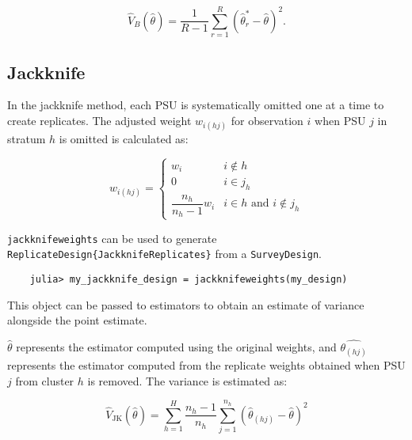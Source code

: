 \documentclass{juliacon}
\begin{document}
\begin{equation}
        \hat{V}_B(\hat{\theta}) = \dfrac{1}{R-1}\sum_{r=1}^{R} (\hat{\theta}^*_r - \hat{\theta})^2.
\end{equation}


\subsection{Jackknife}
In the jackknife method, each PSU is systematically omitted one at a time to create replicates. The adjusted weight \( w_{i(hj)} \) for observation \( i \) when PSU \( j \) in stratum \( h \) is omitted is calculated as:

\begin{equation}
    w_{i(hj)} = \begin{cases}
        w_i & i \notin h\\
    0 & i \in j_{h} \\
    \dfrac{n_h}{n_h - 1} w_i &  i \in h \text{ and } i \notin j_{h}
    \end{cases} %
    \end{equation} \cite{Lohr}

\verb|jackknifeweights| can be used to generate \verb|ReplicateDesign{JackknifeReplicates}| from a \verb|SurveyDesign|. 

\begin{lstlisting}
    julia> my_jackknife_design = jackknifeweights(my_design)
    \end{lstlisting}


This object can be passed to estimators to obtain an estimate of variance alongside the point estimate. 

$\hat{\theta}$ represents the estimator computed using the original weights, and $\hat{\theta_{(hj)}}$ represents the estimator computed from the replicate weights obtained when PSU $j$ from cluster $h$ is removed. The variance is estimated as: 

\begin{equation}
\hat{V}_{\text{JK}}(\hat{\theta}) = \sum_{h = 1}^H \dfrac{n_h - 1}{n_h}\sum_{j = 1}^{n_h}(\hat{\theta}_{(hj)} - \hat{\theta})^2
\end{equation}
\end{document}
